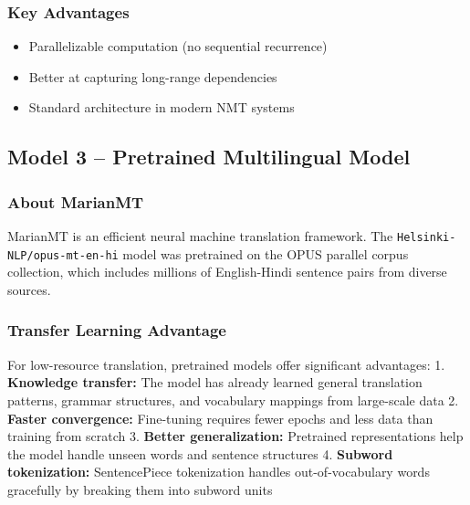 \documentclass[12pt,a4paper,oneside]{report}
\providecommand{\tightlist}{\setlength{\itemsep}{0pt}\setlength{\parskip}{0pt}}
\begin{document}
\hypertarget{key-advantages}{%
\subsubsection{Key Advantages}\label{key-advantages}}

\begin{itemize}
\tightlist
\item
  Parallelizable computation (no sequential recurrence)
\item
  Better at capturing long-range dependencies
\item
  Standard architecture in modern NMT systems
\end{itemize}

\hypertarget{model-3-pretrained-multilingual-model}{%
\subsection{Model 3 -- Pretrained Multilingual Model}\label{model-3-pretrained-multilingual-model}}

\hypertarget{about-marianmt}{%
\subsubsection{About MarianMT}\label{about-marianmt}}

MarianMT is an efficient neural machine translation framework. The \texttt{Helsinki-NLP/opus-mt-en-hi} model was pretrained on the OPUS parallel corpus collection, which includes millions of English-Hindi sentence pairs from diverse sources.

\hypertarget{transfer-learning-advantage}{%
\subsubsection{Transfer Learning Advantage}\label{transfer-learning-advantage}}

For low-resource translation, pretrained models offer significant advantages:
1. \textbf{Knowledge transfer:} The model has already learned general translation patterns, grammar structures, and vocabulary mappings from large-scale data
2. \textbf{Faster convergence:} Fine-tuning requires fewer epochs and less data than training from scratch
3. \textbf{Better generalization:} Pretrained representations help the model handle unseen words and sentence structures
4. \textbf{Subword tokenization:} SentencePiece tokenization handles out-of-vocabulary words gracefully by breaking them into subword units
\end{document}
